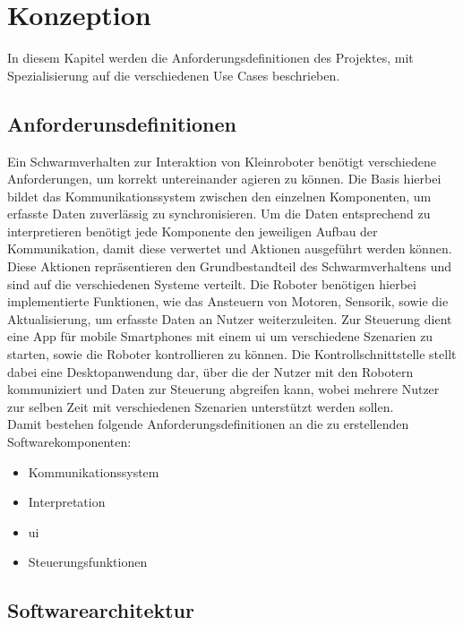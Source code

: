 \color{finishing}

\section{Konzeption}

In diesem Kapitel werden die Anforderungsdefinitionen des Projektes, mit Spezialisierung auf die verschiedenen Use Cases beschrieben.

\subsection{Anforderunsdefinitionen}

Ein Schwarmverhalten zur Interaktion von Kleinroboter benötigt verschiedene Anforderungen, um korrekt untereinander agieren zu können. Die Basis hierbei bildet das Kommunikationssystem zwischen den einzelnen Komponenten, um erfasste Daten zuverlässig zu synchronisieren. Um die Daten entsprechend zu interpretieren benötigt jede Komponente den jeweiligen Aufbau der Kommunikation, damit diese verwertet und Aktionen ausgeführt werden können.\\
Diese Aktionen repräsentieren den Grundbestandteil des Schwarmverhaltens und sind auf die verschiedenen Systeme verteilt. Die Roboter benötigen hierbei implementierte Funktionen, wie das Ansteuern von Motoren, Sensorik, sowie die Aktualisierung, um erfasste Daten an Nutzer weiterzuleiten. Zur Steuerung dient eine App für mobile Smartphones mit einem \gls{ui} um verschiedene Szenarien zu starten, sowie die Roboter kontrollieren zu können. Die Kontrollschnittstelle stellt dabei eine Desktopanwendung dar, über die der Nutzer mit den Robotern kommuniziert und Daten zur Steuerung abgreifen kann, wobei mehrere Nutzer zur selben Zeit mit verschiedenen Szenarien unterstützt werden sollen.\\

\noindent
Damit bestehen folgende Anforderungsdefinitionen an die zu erstellenden Softwarekomponenten:
\begin{itemize}
	\item Kommunikationssystem
	\item Interpretation
	\item \gls{ui}
	\item Steuerungsfunktionen
\end{itemize}

\newpage
\subsection{Softwarearchitektur}

